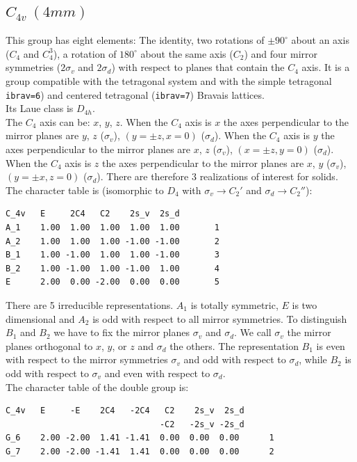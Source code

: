 \documentclass[12pt,a4paper]{article}
\begin{document}
\subsection{\color{web-blue}$C_{4v}\ (4mm)$} 
This group has eight elements: The identity, two rotations of $\pm90^\circ$ 
about an axis ($C_4$ and $C_4^3$), a rotation of $180^\circ$ about the same axis 
($C_2$) and four mirror symmetries ($2\sigma_v$ and $2 \sigma_d$) with respect
to planes that contain the $C_4$ axis.
It is a group compatible with the tetragonal system and with the  
simple tetragonal \texttt{ibrav=6}) and centered tetragonal (\texttt{ibrav=7}) 
Bravais lattices. \\ 
Its Laue class is $D_{4h}$. \\
The $C_4$ axis can be: $x$, $y$, $z$. When the $C_4$ axis is $x$ the axes
perpendicular to the mirror planes are $y$, $z$ ($\sigma_v$), 
$(y=\pm z, x=0)$ ($\sigma_d$). When the $C_4$ axis is $y$
the axes perpendicular to the mirror planes are $x$, $z$ ($\sigma_v$),
$(x=\pm z, y=0)$ ($\sigma_d$). When the 
$C_4$ axis is $z$ the axes perpendicular to the mirror planes are $x$, $y$
($\sigma_v$), $(y=\pm x, z=0)$ ($\sigma_d$).
There are therefore $3$ realizations of interest for solids. \\
The character table is (isomorphic to $D_4$ with $\sigma_v \rightarrow C_2'$
and $\sigma_d \rightarrow C_2''$):
\begin{verbatim}
C_4v   E     2C4   C2    2s_v  2s_d 
A_1    1.00  1.00  1.00  1.00  1.00       1
A_2    1.00  1.00  1.00 -1.00 -1.00       2
B_1    1.00 -1.00  1.00  1.00 -1.00       3
B_2    1.00 -1.00  1.00 -1.00  1.00       4
E      2.00  0.00 -2.00  0.00  0.00       5
\end{verbatim}
There are 5 irreducible representations. $A_1$ is totally symmetric, $E$ is
two dimensional and $A_2$ is odd with respect to all mirror symmetries.
To distinguish $B_1$ and $B_2$ we have to fix the mirror planes
$\sigma_v$ and $\sigma_d$. We call $\sigma_v$
the mirror planes orthogonal to $x$, $y$, or $z$ and $\sigma_d$ the others.
The representation $B_1$ is even with respect to the mirror symmetries
$\sigma_v$ and odd with respect to $\sigma_d$, while $B_2$ is odd with respect to
$\sigma_v$ and even with respect to $\sigma_d$. \\
The character table of the double group is:
\begin{verbatim}
C_4v   E     -E    2C4   -2C4   C2    2s_v  2s_d
                               -C2   -2s_v -2s_d
G_6    2.00 -2.00  1.41 -1.41  0.00  0.00  0.00      1
G_7    2.00 -2.00 -1.41  1.41  0.00  0.00  0.00      2
\end{verbatim}
\end{document}
